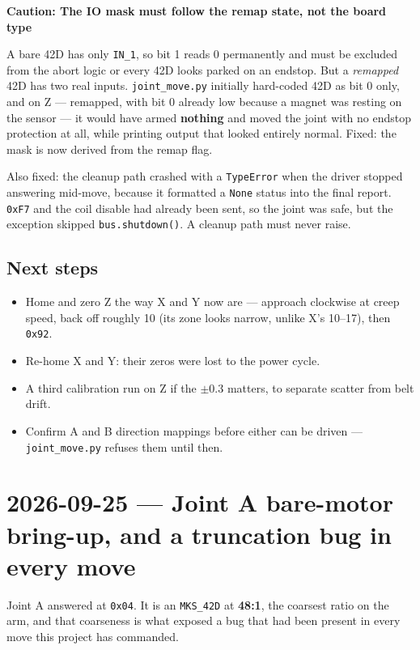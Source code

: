 \documentclass[11pt,letterpaper]{article}
\newenvironment{caution}[1]{%
    \par\addvspace{8pt}%
    \noindent{\color{cautionred}\rule{\linewidth}{0.8pt}}\par\vspace{2pt}
    \noindent\textbf{\color{cautionred}Caution: #1}\par\vspace{2pt}
}{%
    \par\vspace{2pt}\noindent{\color{cautionred}\rule{\linewidth}{0.4pt}}%
    \par\addvspace{8pt}%
}
\begin{document}
\begin{caution}{The IO mask must follow the remap state, not the board type}
A bare 42D has only \texttt{IN\_1}, so bit 1 reads 0 permanently and must be
excluded from the abort logic or every 42D looks parked on an endstop. But a
\emph{remapped} 42D has two real inputs. \texttt{joint\_move.py} initially
hard-coded 42D as bit 0 only, and on Z --- remapped, with bit 0 already low
because a magnet was resting on the sensor --- it would have armed
\textbf{nothing} and moved the joint with no endstop protection at all, while
printing output that looked entirely normal. Fixed: the mask is now derived from
the remap flag.
\end{caution}

Also fixed: the cleanup path crashed with a \texttt{TypeError} when the driver
stopped answering mid-move, because it formatted a \texttt{None} status into the
final report. \texttt{0xF7} and the coil disable had already been sent, so the
joint was safe, but the exception skipped \texttt{bus.shutdown()}. A cleanup path
must never raise.

\subsection{Next steps}
\begin{itemize}
    \item Home and zero Z the way X and Y now are --- approach clockwise at creep
    speed, back off roughly 10\textdegree{} (its zone looks narrow, unlike X's
    10--17\textdegree{}), then \texttt{0x92}.
    \item Re-home X and Y: their zeros were lost to the power cycle.
    \item A third calibration run on Z if the $\pm0.3$\textdegree{} matters,
    to separate scatter from belt drift.
    \item Confirm A and B direction mappings before either can be driven ---
    \texttt{joint\_move.py} refuses them until then.
\end{itemize}

\section{2026-09-25 --- Joint A bare-motor bring-up, and a truncation bug in every move}
\label{sec:session-2026-09-25}
Joint A answered at \texttt{0x04}. It is an \texttt{MKS\_42D} at \textbf{48:1},
the coarsest ratio on the arm, and that coarseness is what exposed a bug that had
been present in every move this project has commanded.
\end{document}
